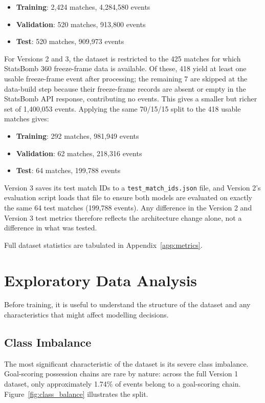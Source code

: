 \begin{itemize}
    \item \textbf{Training}: 2,424 matches, 4,284,580 events
    \item \textbf{Validation}: 520 matches, 913,800 events
    \item \textbf{Test}: 520 matches, 909,973 events
\end{itemize}

For Versions 2 and 3, the dataset is restricted to the 425 matches for which StatsBomb 360 freeze-frame data is available. Of these, 418 yield at least one usable freeze-frame event after processing; the remaining 7 are skipped at the data-build step because their freeze-frame records are absent or empty in the StatsBomb API response, contributing no events. This gives a smaller but richer set of 1,400,053 events. Applying the same 70/15/15 split to the 418 usable matches gives:

\begin{itemize}
    \item \textbf{Training}: 292 matches, 981,949 events
    \item \textbf{Validation}: 62 matches, 218,316 events
    \item \textbf{Test}: 64 matches, 199,788 events
\end{itemize}

Version 3 saves its test match IDs to a \texttt{test\_match\_ids.json} file, and Version 2's evaluation script loads that file to ensure both models are evaluated on exactly the same 64 test matches (199,788 events). Any difference in the Version 2 and Version 3 test metrics therefore reflects the architecture change alone, not a difference in what was tested.

Full dataset statistics are tabulated in Appendix~\ref{app:metrics}.

\section{Exploratory Data Analysis}\label{sec:eda}

Before training, it is useful to understand the structure of the dataset and any characteristics that might affect modelling decisions.

\subsection{Class Imbalance}

The most significant characteristic of the dataset is its severe class imbalance. Goal-scoring possession chains are rare by nature: across the full Version 1 dataset, only approximately 1.74\% of events belong to a goal-scoring chain. Figure~\ref{fig:class_balance} illustrates the split.



